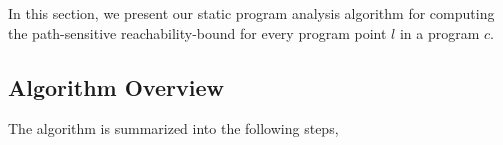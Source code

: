 In this section, we present our static program analysis algorithm for computing 
the path-sensitive reachability-bound for every program point $l$ in a program $c$.
%
\subsection{Algorithm Overview}
\label{sec:alg_overview}
The algorithm is summarized into the following steps,
%
%
